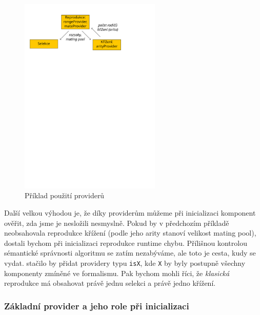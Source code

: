 \begin{figure}[h!]
\begin{center}
  \includegraphics[width=0.6\textwidth]{img/providersEx}
  \caption{Příklad použití providerů}\label{providersEx}
  \end{center}
\end{figure}

Další velkou výhodou je, že díky providerům můžeme při inicializaci komponent ověřit, zda jsme je nesložili nesmyslně. Pokud by v předchozím příkladě neobsahovala reprodukce křížení (podle jeho arity stanoví velikost mating pool), dostali bychom při inicializaci reprodukce runtime chybu. Přílišnou kontrolou sémantické správnosti algoritmu se zatím nezabýváme, ale toto je cesta, kudy se vydat. stačilo by přidat providery typu \texttt{isX}, kde \texttt{X} by byly postupně všechny komponenty zmíněné ve formalismu. Pak bychom mohli říci, že \emph{klasická} reprodukce má obsahovat právě jednu selekci a právě jedno křížení.

\subsubsection{Základní provider a jeho role při inicializaci}

